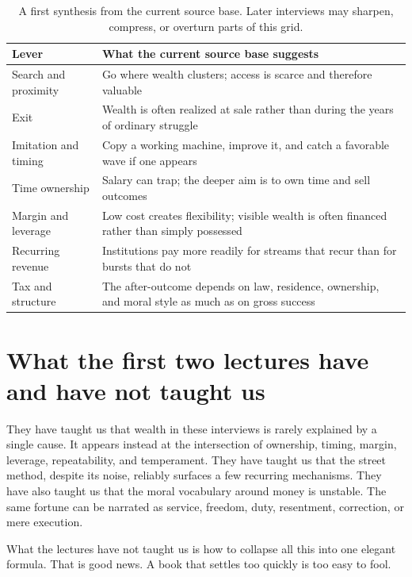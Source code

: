 \documentclass[11pt,oneside]{book}
\begin{document}
\begin{table}[h]
\centering
\begin{tabular}{|l|p{}|}
\hline
Lever & What the current source base suggests \\
\hline
Search and proximity & Go where wealth clusters; access is scarce and therefore valuable \\
\hline
Exit & Wealth is often realized at sale rather than during the years of ordinary struggle \\
\hline
Imitation and timing & Copy a working machine, improve it, and catch a favorable wave if one appears \\
\hline
Time ownership & Salary can trap; the deeper aim is to own time and sell outcomes \\
\hline
Margin and leverage & Low cost creates flexibility; visible wealth is often financed rather than simply possessed \\
\hline
Recurring revenue & Institutions pay more readily for streams that recur than for bursts that do not \\
\hline
Tax and structure & The after-outcome depends on law, residence, ownership, and moral style as much as on gross success \\
\hline
\end{tabular}
\caption{A first synthesis from the current source base. Later interviews may sharpen, compress, or overturn parts of this grid.}
\end{table}

\section{What the first two lectures have and have not taught us}

They have taught us that wealth in these interviews is rarely explained by a single cause. It appears instead at the intersection of ownership, timing, margin, leverage, repeatability, and temperament. They have taught us that the street method, despite its noise, reliably surfaces a few recurring mechanisms. They have also taught us that the moral vocabulary around money is unstable. The same fortune can be narrated as service, freedom, duty, resentment, correction, or mere execution.

What the lectures have not taught us is how to collapse all this into one elegant formula. That is good news. A book that settles too quickly is too easy to fool.

\backmatter
\end{document}
